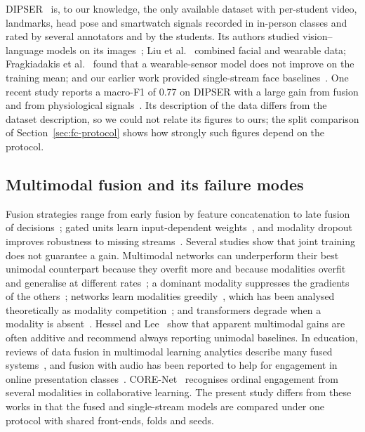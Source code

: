 DIPSER~\cite{marquezcarpintero2025dipser} is, to our knowledge, the only available dataset with per-student video, landmarks, head pose and smartwatch signals recorded in in-person classes and rated by several annotators and by the students. Its authors studied vision--language models on its images~\cite{marquezcarpintero2025enhancing}; Liu et al.~\cite{liu2025attention} combined facial and wearable data; Fragkiadakis et al.~\cite{fragkiadakis2026fairness} found that a wearable-sensor model does not improve on the training mean; and our earlier work provided single-stream face baselines~\cite{makhkhas2026ordinal}. One recent study reports a macro-F1 of 0.77 on DIPSER with a large gain from fusion and from physiological signals~\cite{dan2026multimodal}. Its description of the data differs from the dataset description, so we could not relate its figures to ours; the split comparison of Section~\ref{sec:fc-protocol} shows how strongly such figures depend on the protocol.

\subsection{Multimodal fusion and its failure modes}
Fusion strategies range from early fusion by feature concatenation to late fusion of decisions~\cite{baltrusaitis2019multimodal}; gated units learn input-dependent weights~\cite{arevalo2017gated}, and modality dropout improves robustness to missing streams~\cite{neverova2016moddrop}. Several studies show that joint training does not guarantee a gain. Multimodal networks can underperform their best unimodal counterpart because they overfit more and because modalities overfit and generalise at different rates~\cite{wang2020makes}; a dominant modality suppresses the gradients of the others~\cite{peng2022balanced}; networks learn modalities greedily~\cite{wu2022characterizing}, which has been analysed theoretically as modality competition~\cite{huang2022modality}; and transformers degrade when a modality is absent~\cite{ma2022robust}. Hessel and Lee~\cite{hessel2020does} show that apparent multimodal gains are often additive and recommend always reporting unimodal baselines. In education, reviews of data fusion in multimodal learning analytics describe many fused systems~\cite{chango2022datafusionmmla}, and fusion with audio has been reported to help for engagement in online presentation classes~\cite{wu2024cmose}. CORE-Net~\cite{tran2026ordinal} recognises ordinal engagement from several modalities in collaborative learning. The present study differs from these works in that the fused and single-stream models are compared under one protocol with shared front-ends, folds and seeds.

